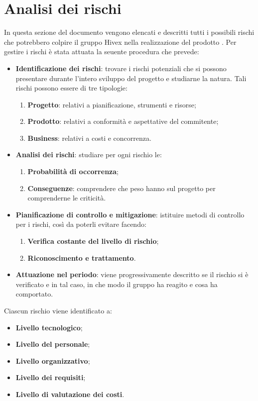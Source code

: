 \section{Analisi dei rischi}
In questa sezione del documento vengono elencati e descritti tutti i possibili rischi che potrebbero colpire il gruppo Hivex nella realizzazione del prodotto \proj. Per gestire i rischi è stata attuata la seuente procedura che prevede:
\begin{itemize}
	\item \textbf{Identificazione dei rischi}: trovare i rischi potenziali che si possono presentare durante l'intero sviluppo del progetto e studiarne la natura. Tali rischi possono essere di tre tipologie:
	\begin{enumerate}
		\item \textbf{Progetto}: relativi a pianificazione, strumenti e risorse;
		\item \textbf{Prodotto}: relativi a conformità e aspettative del commitente;
		\item \textbf{Business}: relativi a costi e concorrenza.
	\end{enumerate}
	\item \textbf{Analisi dei rischi}: studiare per ogni rischio le:
	\begin{enumerate}
		\item \textbf{Probabilità di occorrenza};
		\item \textbf{Conseguenze}: comprendere che peso hanno sul progetto per comprenderne le criticità.
	\end{enumerate}
	\item \textbf{Pianificazione di controllo e mitigazione}: istituire metodi di controllo per i rischi, così da poterli evitare facendo:
	\begin{enumerate}
		\item \textbf{Verifica costante del livello di rischio};
		\item \textbf{Riconoscimento e trattamento}.
	\end{enumerate}
	\item \textbf{Attuazione nel periodo}: viene progressivamente descritto se il rischio si è verificato e in tal caso, in che modo il gruppo ha reagito e cosa ha comportato.
\end{itemize}
Ciascun rischio viene identificato a:
\begin{itemize}
	\item \textbf{Livello tecnologico};
	\item \textbf{Livello del personale};
	\item \textbf{Livello organizzativo};
	\item \textbf{Livello dei requisiti};
	\item \textbf{Livello di valutazione dei costi}.
\end{itemize}
